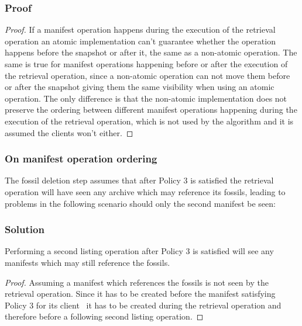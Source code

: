 \documentclass[english,utf8,aspectratio=169]{beamer}
\begin{document}
    \begin{frame}
        \frametitle{Proof}
        \begin{proof}
            If a manifest operation happens during the execution of the retrieval operation an atomic
            implementation can't guarantee whether the operation happens before the snapshot
            or after it, the same as a non-atomic operation.
            The same is true for manifest operations happening before or after the execution of the
            retrieval operation, since a non-atomic operation can not move them before or after the
            snapshot giving them the same visibility when using an atomic operation.
            The only difference is that the non-atomic implementation does not preserve the ordering
            between different manifest operations happening during the execution of the retrieval operation,
            which is not used by the algorithm and it is assumed the clients won't either.
        \end{proof}
    \end{frame}

    \begin{frame}
        \frametitle{On manifest operation ordering}
        The fossil deletion step assumes that after Policy 3 is satisfied the retrieval operation
        will have seen any archive which may reference its fossils, leading to problems in the
        following scenario should only the second manifest be seen:
        \begin{center}
            
        \end{center}
    \end{frame}

    \begin{frame}
        \frametitle{Solution}
        \begin{theorem}
            Performing a second listing operation after Policy 3 is satisfied will see any manifests
            which may still reference the fossils.
        \end{theorem}
        \begin{proof}
            Assuming a manifest which references the fossils is not seen by the retrieval operation.
            Since it has to be created before the manifest satisfying Policy 3 for its
            client~\cite[Policy 2]{Duplicacy} it has to be created during the retrieval operation
            and therefore before a following second listing operation.
        \end{proof}
    \end{frame}
\end{document}
